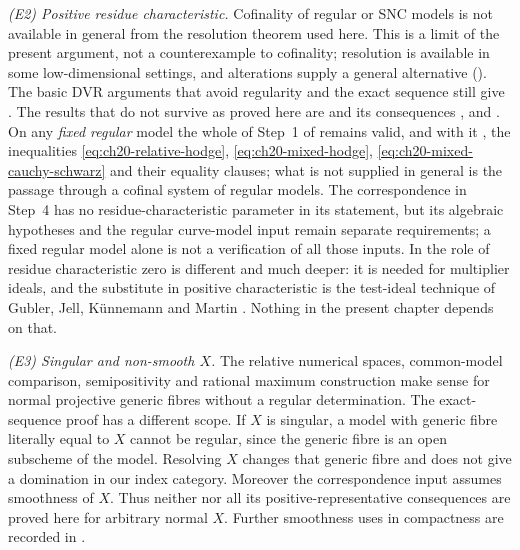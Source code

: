 \emph{(E2) Positive residue characteristic.}  Cofinality of regular or SNC
models is not available in general from the resolution theorem used here.
This is a limit of the present argument, not a counterexample to
cofinality; resolution is available in some low-dimensional settings,
and alterations supply a general alternative
().
The basic DVR arguments that avoid regularity and the exact sequence
still give
.
The results that do not survive as proved here are
 and its consequences
,  and
.  On any \emph{fixed regular}
model the whole of Step~1 of  remains valid, and
with it , the inequalities
\eqref{eq:ch20-relative-hodge}, \eqref{eq:ch20-mixed-hodge},
\eqref{eq:ch20-mixed-cauchy-schwarz} and their equality clauses; what is
not supplied in general is the passage through a cofinal system of regular
models.  The correspondence in Step~4 has no residue-characteristic
parameter in its statement, but its algebraic hypotheses and the
regular curve-model input remain separate requirements; a fixed regular
model alone is not a verification of all those inputs.  In
 the role of residue
characteristic zero is different and much deeper: it is needed for
multiplier ideals, and the substitute in positive characteristic is the
test-ideal technique of Gubler, Jell, K\"unnemann and Martin
\cite{GJKM19}.  Nothing in the present chapter depends on that.

\emph{(E3) Singular and non-smooth $X$.}  The relative numerical spaces,
common-model comparison, semipositivity and rational maximum construction
make sense for normal projective generic fibres without a regular
determination.  The exact-sequence proof has a different scope.
If $X$ is singular, a model with generic fibre literally equal to $X$
cannot be regular, since the generic fibre is an open subscheme of the
model.  Resolving $X$ changes that generic fibre and does not give a
domination in our index category.  Moreover the correspondence input
 assumes smoothness of $X$.
Thus neither  nor all its positive-representative
consequences are proved here for arbitrary normal $X$.  Further
smoothness uses in compactness are recorded in
.

